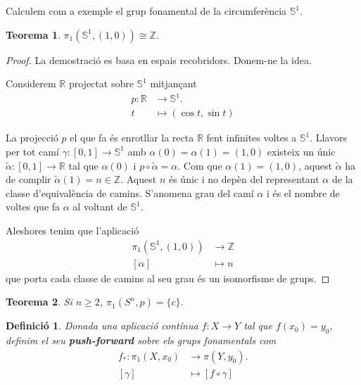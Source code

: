 \documentclass{article}
\newtheorem{teorema}{Teorema}
\newtheorem{definicio}{Definici\'{o}}
\theoremstyle{definition}
\begin{document}
Calculem com a exemple el grup fonamental de la circumfer\`{e}ncia $\mathbb{S}^1$.

\begin{teorema}
$\pi_1(\mathbb{S}^1,(1,0))\cong\mathbb{Z}$.
\end{teorema}
\begin{proof}
La demostraci\'{o} es basa en espais recobridors. Donem-ne la idea.

Considerem $\mathbb{R}$ projectat sobre $\mathbb{S}^1$ mitjan\c{c}ant
\begin{align*}
p:\mathbb{R}&\longrightarrow \mathbb{S}^1.\\
t&\longmapsto(\cos t,\sin t)
\end{align*}

La projecci\'{o} $p$ el que fa \'{e}s enrotllar la recta $\mathbb{R}$ fent infinites voltes a $\mathbb{S}^1$. Llavors per tot cam\'{i} $\gamma:[0,1]\rightarrow \mathbb{S}^1$ amb $\alpha(0)=\alpha(1)=(1,0)$ existeix un \'{u}nic $\tilde{\alpha}:[0,1]\rightarrow\mathbb{R}$ tal que $\alpha(0)$ i $p\circ\tilde{\alpha}=\alpha$. Com que $\alpha(1)=(1,0)$, aquest $\tilde{\alpha}$ ha de complir $\tilde{\alpha}(1)=n\in\mathbb{Z}$. Aquest $n$ \'{e}s \'{u}nic i no dep\`{e}n del representant $\alpha$ de la classe d'equival\`{e}ncia de camins. S'anomena grau del cam\'{i} $\alpha$ i \'{e}s el nombre de voltes que fa $\alpha$ al voltant de $\mathbb{S}^1$.

Aleshores tenim que l'aplicaci\'{o}
\begin{align*}
\pi_1(\mathbb{S}^1,(1,0))&\longrightarrow\mathbb{Z}\\ 
[\alpha]&\longmapsto n
\end{align*}
que porta cada classe de camins al seu grau \'{e}s un isomorfisme de grups.
\end{proof}

\begin{teorema}
Si $n\geq2$, $\pi_1(S^n,p)=\{c\}$.
\end{teorema}

\begin{definicio}
Donada una aplicaci\'{o} cont\'{i}nua $f:X\rightarrow Y$ tal que $f(x_0)=y_0$, definim el seu \textbf{\emph{push-forward}} sobre els grups fonamentals com
\begin{align*}
f_*:\pi_1(X,x_0)&\longrightarrow\pi(Y,y_0).\\
[\gamma]&\longmapsto[f\circ\gamma]
\end{align*}
\end{definicio}
\end{document}
